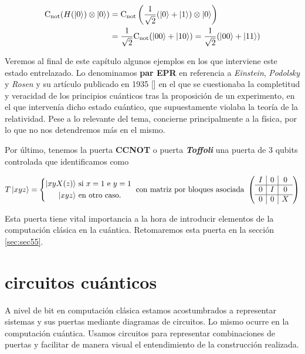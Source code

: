 \begin{equation}
\begin{split}
\mathrm{C_{not}}(H(\left|0\right\rangle)\otimes\left|0\right\rangle)&=\mathrm{C_{not}}\left(\dfrac{1}{\sqrt{2}}(\left|0\right\rangle+\left|1\right\rangle)\otimes\left|0\right\rangle\right)\\
&=\dfrac{1}{\sqrt{2}}\mathrm{C_{not}}(\left|00\right\rangle+\left|10\right\rangle)=\dfrac{1}{\sqrt{2}}(\left|00\right\rangle+\left|11\right\rangle)
\end{split}
\end{equation}

Veremos al final de este capítulo algunos ejemplos en los que interviene este estado entrelazado. Lo denominamos \textbf{par EPR} en referencia a \textit{Einstein}, \textit{Podolsky} y \textit{Rosen} y su artículo publicado en 1935 [\cite{einstein1935can}] en el que se cuestionaba la completitud y veracidad de los principios cuánticos tras la proposición de un experimento, en el que intervenía dicho estado cuántico, que supuestamente violaba la teoría de la relatividad. Pese a lo relevante del tema, concierne principalmente a la física, por lo que no nos detendremos más en el mismo.

Por último, tenemos la puerta \textbf{CCNOT} o puerta \textbf{\textit{Toffoli}} una puerta de 3 qubits controlada que identificamos como

\[T\ket{xyz}=\left\{\begin{aligned}
\ket{xyX(z)}&\mathrm{\ si\ } x=1\mathrm{\ e\ } y=1\\
\ket{xyz}&\mathrm{\ en\ otro\ caso.}\end{aligned}\right. \mathrm{\ con\ matriz\ por\ bloques\ asociada\ }\left(\begin{array}{c|c|c}I&0&0\\\hline0&I&0\\\hline0&0&X\end{array}\right)\]

Esta puerta tiene vital importancia a la hora de introducir elementos de la computación clásica en la cuántica. Retomaremos esta puerta en la sección \ref{sec:sec55}.

\section{circuitos cuánticos}

A nivel de bit en computación clásica estamos acostumbrados a representar sistemas y sus puertas mediante diagramas de circuitos. Lo mismo ocurre en la computación cuántica. Usamos circuitos para representar combinaciones de puertas y facilitar de manera visual el entendimiento de la construcción realizada.

